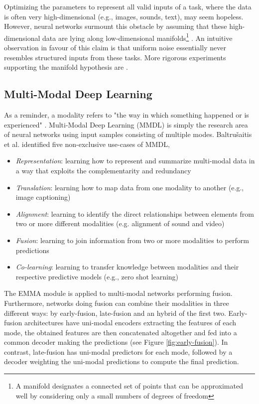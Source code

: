 Optimizing the parameters to represent all valid inputs of a task, where the data is often very high-dimensional (e.g., images, sounds, text), may seem hopeless. However, neural networks surmount this obstacle by assuming that these high-dimensional data are lying along low-dimensional manifolds\footnote{A manifold designates a connected set of points that can be approximated well by considering only a small numbers of degrees of freedom} \citep{goodfellow-book}. An intuitive observation in favour of this claim is that uniform noise essentially never resembles structured inputs from these tasks. More rigorous experiments supporting the manifold hypothesis are \citep{manifold-1, manifold-2, manifold-3}.


\subsection*{Multi-Modal Deep Learning}\label{sec:mmdl}
As a reminder, a modality refers to "the way in which something happened or is experienced" \citep{taxomany-multimodal}. Multi-Modal Deep Learning (MMDL) is simply the research area of neural networks using input samples consisting of multiple modes. Baltrušaitis et al. identified five non-exclusive use-cases of MMDL,
\begin{itemize}
\item \textit{Representation}: learning how to represent and summarize multi-modal data in a way that exploits the complementarity and redundancy
\item \textit{Translation}: learning how to map data from one modality to another (e.g., image captioning)
\item \textit{Alignment}: learning to identify the direct relationships between elements from two or more different modalities (e.g. alignment of sound and video)
\item \textit{Fusion}: learning to join information from two or more modalities to perform predictions 
\item \textit{Co-learning}: learning to transfer knowledge between modalities and their respective predictive models (e.g., zero shot learning)
\end{itemize}
The EMMA module is applied to multi-modal networks performing fusion. Furthermore, networks doing fusion can combine their modalities in three different ways: by early-fusion, late-fusion and an hybrid of the first two. Early-fusion architectures have uni-modal encoders extracting the features of each mode, the obtained features are then concatenated altogether and fed into a common decoder making the predictions (see Figure \ref{fig:early-fusion}). In contrast, late-fusion has uni-modal predictors for each mode, followed by a decoder weighting the uni-modal predictions to compute the final prediction. 
